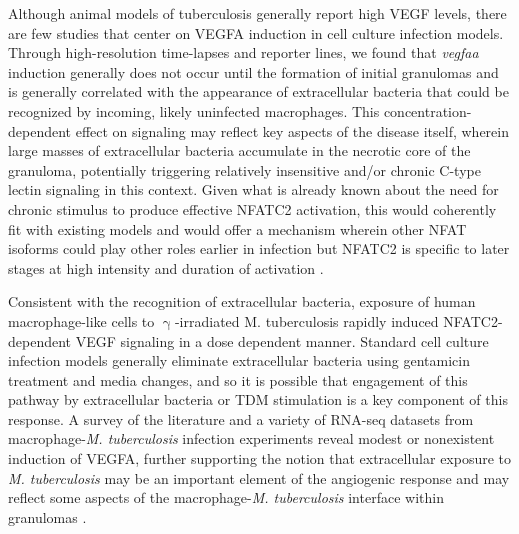 Although animal models of tuberculosis generally report high VEGF levels, there are few studies that center on VEGFA induction in cell culture infection models. Through high-resolution time-lapses and reporter lines, we found that \textit{vegfaa} induction generally does not occur until the formation of initial granulomas and is generally correlated with the appearance of extracellular bacteria that could be recognized by incoming, likely uninfected macrophages. This concentration-dependent effect on signaling may reflect key aspects of the disease itself, wherein large masses of extracellular bacteria accumulate in the necrotic core of the granuloma, potentially triggering relatively insensitive and/or chronic C-type lectin signaling in this context. Given what is already known about the need for chronic stimulus to produce effective NFATC2 activation, this would coherently fit with existing models and would offer a mechanism wherein other NFAT isoforms could play other roles earlier in infection but NFATC2 is specific to later stages at high intensity and duration of activation \citep{Yissachar2013, Kar2015}. 

Consistent with the recognition of extracellular bacteria, exposure of human macrophage-like cells to $\upgamma$-irradiated M. tuberculosis rapidly induced NFATC2-dependent VEGF signaling in a dose dependent manner. Standard cell culture infection models generally eliminate extracellular bacteria using gentamicin treatment and media changes, and so it is possible that engagement of this pathway by extracellular bacteria or TDM stimulation is a key component of this response. A survey of the literature and a variety \citep{Lee2019, Pisu2020, Hall2021, Looney2021, Pu2021} of RNA-seq datasets from macrophage-\textit{M. tuberculosis} infection experiments reveal modest or nonexistent induction of VEGFA, further supporting the notion that extracellular exposure to \textit{M. tuberculosis} may be an important element of the angiogenic response and may reflect some aspects of the macrophage-\textit{M. tuberculosis} interface within granulomas \citep{Orme2014b}.

